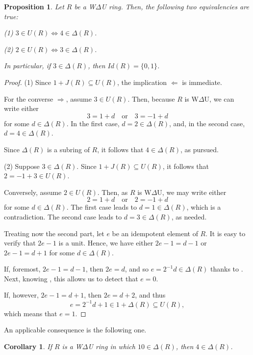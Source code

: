 \documentclass[12pt]{amsart}
\newtheorem{proposition}[theorem]{Proposition}
\newtheorem{corollary}[theorem]{Corollary}
\theoremstyle{definition}
\begin{document}
\begin{proposition}\label{memeber}
Let \( R \) be a W$\Delta$U ring. Then, the following two equivalencies are true:

(1) \( 3 \in U(R) \iff 4 \in \Delta(R) \).

(2) \( 2 \in U(R) \iff 3 \in \Delta(R) \).

In particular, if \(3 \in \Delta(R)\), then \(Id(R) = \{0, 1\}\).
\end{proposition}

\begin{proof}
(1) Since \( 1 + J(R) \subseteq U(R) \), the implication \( \Leftarrow \) is immediate.
	
For the converse \( \Rightarrow \), assume \( 3 \in U(R) \). Then, because \( R \) is W$\Delta$U, we can write either
\[
3 = 1 + d \quad \text{or} \quad 3 = -1 + d
\]
for some \( d \in \Delta(R) \). In the first case, \( d = 2 \in \Delta(R) \), and, in the second case, \( d = 4 \in \Delta(R) \).
	
Since $\Delta(R)$ is a subring of $R$, it follows that \( 4 \in \Delta(R) \), as pursued.
	
(2) Suppose \( 3 \in \Delta(R) \). Since \( 1 + J(R) \subseteq U(R) \), it follows that \( 2 = -1 + 3 \in U(R) \).
	
Conversely, assume \( 2 \in U(R) \). Then, as \( R \) is W$\Delta$U, we may write either
\[
2 = 1 + d \quad \text{or} \quad 2 = -1 + d
\]
for some \( d \in \Delta(R) \). The first case leads to \( d = 1 \in \Delta(R) \), which is a contradiction. The second case leads to \( d = 3 \in \Delta(R) \), as needed.

Treating now the second part, let $e$ be an idempotent element of $R$. It is easy to verify that $2e-1$ is a unit. Hence, we have either $2e-1=d-1$ or $2e-1=d+1$ for some $d\in \Delta(R)$.

If, foremost, $2e-1=d-1$, then $2e=d$, and so $e=2^{-1}d\in \Delta(R)$ thanks to \cite[Lemma 1(2)]{2}. Next, knowing \cite[Proposition 15]{2}, this allows us to detect that $e=0$.

If, however, $2e-1=d+1$, then $2e=d+2$, and thus $$e=2^{-1}d+1\in 1+\Delta(R)\subseteq U(R),$$ which means that $e=1$.	 \end{proof}

An applicable consequence is the following one.

\begin{corollary}
If \( R \) is a W$\Delta$U ring in which \( 10 \in \Delta(R) \), then \( 4 \in \Delta(R) \).
\end{corollary}
\end{document}
